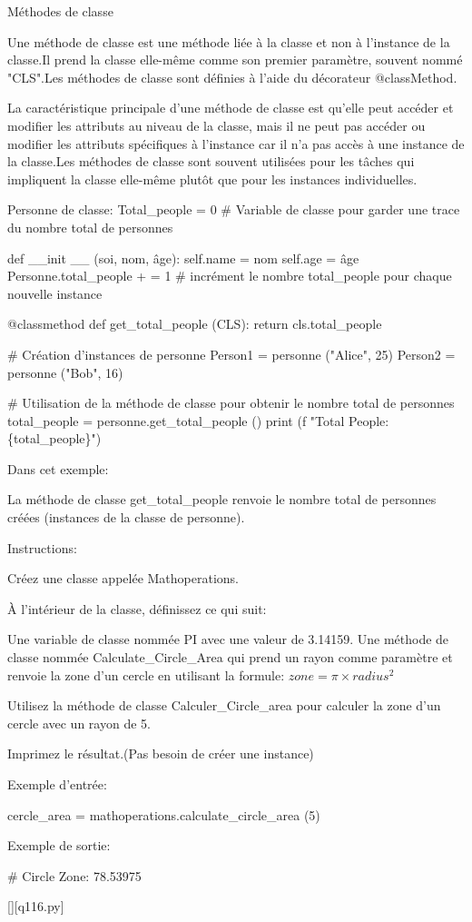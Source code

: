         \question
        Méthodes de classe

Une méthode de classe est une méthode liée à la classe et non à l'instance de la classe.Il prend la classe elle-même comme son premier paramètre, souvent nommé "CLS".Les méthodes de classe sont définies à l'aide du décorateur @classMethod.

La caractéristique principale d'une méthode de classe est qu'elle peut accéder et modifier les attributs au niveau de la classe, mais il ne peut pas accéder ou modifier les attributs spécifiques à l'instance car il n'a pas accès à une instance de la classe.Les méthodes de classe sont souvent utilisées pour les tâches qui impliquent la classe elle-même plutôt que pour les instances individuelles.

Personne de classe:
Total\_people = 0 \# Variable de classe pour garder une trace du nombre total de personnes

def \_\_init \_\_ (soi, nom, âge):
self.name = nom
self.age = âge
Personne.total\_people + = 1 \# incrément le nombre total\_people pour chaque nouvelle instance

@classmethod
def get\_total\_people (CLS):
return cls.total\_people

\# Création d'instances de personne
Person1 = personne ("Alice", 25)
Person2 = personne ("Bob", 16)

\# Utilisation de la méthode de classe pour obtenir le nombre total de personnes
total\_people = personne.get\_total\_people ()
print (f "Total People: \{total\_people\}")

Dans cet exemple:

La méthode de classe get\_total\_people renvoie le nombre total de personnes créées (instances de la classe de personne).

Instructions:

Créez une classe appelée Mathoperations.

À l'intérieur de la classe, définissez ce qui suit:

Une variable de classe nommée PI avec une valeur de 3.14159.
Une méthode de classe nommée Calculate\_Circle\_Area qui prend un rayon comme paramètre et renvoie la zone d'un cercle en utilisant la formule: $zone = \pi × radius^2$

Utilisez la méthode de classe Calculer\_Circle\_area pour calculer la zone d'un cercle avec un rayon de 5.

Imprimez le résultat.(Pas besoin de créer une instance)

Exemple d'entrée:

cercle\_area = mathoperations.calculate\_circle\_area (5)

Exemple de sortie:

\# Circle Zone: 78.53975
        \par
        \renewcommand{\nomfichier}{q116.py}
        \begin{solution}
            \pythonfile{\chemincode \nomfichier}[][\nomfichier]
        \end{solution}
        
